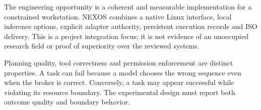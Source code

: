 The engineering opportunity is a coherent and measurable implementation for a constrained workstation. NEXOS combines a native Linux interface, local inference options, explicit adapter authority, persistent execution records and ISO delivery. This is a project integration focus; it is not evidence of an unoccupied research field or proof of superiority over the reviewed systems.

Planning quality, tool correctness and permission enforcement are distinct properties. A task can fail because a model chooses the wrong sequence even when the broker is correct. Conversely, a task may appear successful while violating its resource boundary. The experimental design must report both outcome quality and boundary behavior.
